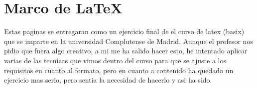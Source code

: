 \section{Marco de LaTeX}
Estas paginas se entregaran como un ejercicio final de el curso de latex (basix) que se imparte en la universidad Complutense de Madrid. Aunque el profesor nos pidio que fuera algo creativo, a mi me ha salido hacer esto, he intentado aplicar varias de las tecnicas que vimos dentro del curso para que se ajuste a los requisitos en cuanto al formato, pero en cuanto a contenido ha quedado un ejercicio mas serio, pero sentia la necesidad de hacerlo y asi ha sido.

